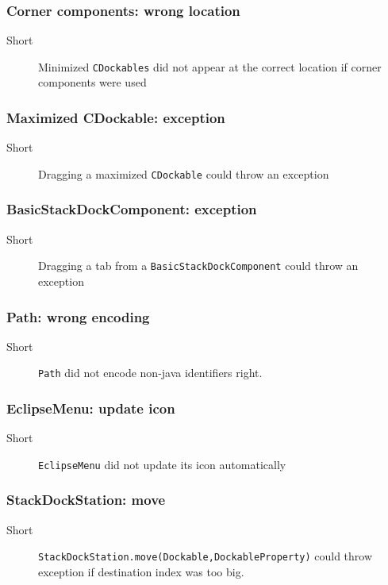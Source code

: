 \documentclass[a4paper,10pt]{article}
\newcommand{\src}[1]{\lstinline[basicstyle=\normalsize\ttfamily,keywordstyle=\normalsize\ttfamily,identifierstyle=\normalsize\ttfamily]|#1|}
\newcommand{\short}{\item[Short]}
\begin{document}
\subsubsection{Corner components: wrong location}
\begin{description}
 \short Minimized \src{CDockables} did not appear at the correct location if corner components were used
\end{description}

\subsubsection{Maximized CDockable: exception}
\begin{description}
 \short Dragging a maximized \src{CDockable} could throw an exception
\end{description}


\subsubsection{BasicStackDockComponent: exception}
\begin{description}
 \short Dragging a tab from a \src{BasicStackDockComponent} could throw an exception
\end{description}

\subsubsection{Path: wrong encoding}
\begin{description}
 \short \src{Path} did not encode non-java identifiers right.
\end{description}

\subsubsection{EclipseMenu: update icon}
\begin{description}
 \short \src{EclipseMenu} did not update its icon automatically
\end{description}

\subsubsection{StackDockStation: move}
\begin{description}
 \short \src{StackDockStation.move(Dockable,DockableProperty)} could throw \linebreak exception if destination index was too big.
\end{description}
\end{document}
